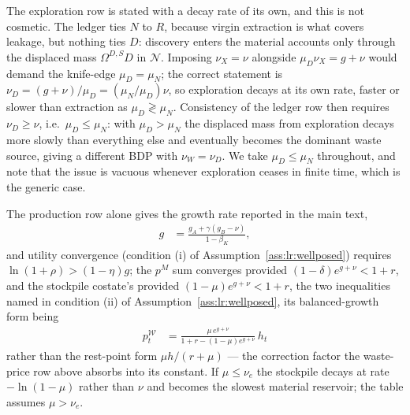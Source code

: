 The exploration row is stated with a decay rate of its own, and this is not cosmetic. The ledger ties $N$ to $R$, because virgin extraction is what covers leakage, but nothing ties $D$: discovery enters the material accounts only through the displaced mass $\Omega^{D,S}D$ in $\mathcal N$. Imposing $\nu_X=\nu$ alongside $\mu_D\nu_X=g+\nu$ would demand the knife-edge $\mu_D=\mu_N$; the correct statement is $\nu_D=\left(g+\nu\right)/\mu_D=\left(\mu_N/\mu_D\right)\nu$, so exploration decays at its own rate, faster or slower than extraction as $\mu_D\gtrless\mu_N$. Consistency of the ledger row then requires $\nu_D\ge\nu$, i.e.\ $\mu_D\le\mu_N$: with $\mu_D>\mu_N$ the displaced mass from exploration decays more slowly than everything else and eventually becomes the dominant waste source, giving a different BDP with $\nu_W=\nu_D$. We take $\mu_D\le\mu_N$ throughout, and note that the issue is vacuous whenever exploration ceases in finite time, which is the generic case.

The production row alone gives the growth rate reported in the main text,
\begin{align}
g &= \frac{g_A+\gamma\left(g_B-\nu\right)}{1-\beta_K},
\label{eq:app:wh:g}
\end{align}
and utility convergence (condition (i) of Assumption~\ref{ass:lr:wellposed}) requires $\ln\left(1+\rho\right)>\left(1-\eta\right)g$; the $p^M$ sum converges provided $\left(1-\delta\right)e^{g+\nu}<1+r$, and the stockpile costate's provided $\left(1-\mu\right)e^{g+\nu}<1+r$, the two inequalities named in condition (ii) of Assumption~\ref{ass:lr:wellposed}, its balanced-growth form being
\begin{align}
p^{\mathcal W}_t &= \frac{\mu\,e^{g+\nu}}{1+r-\left(1-\mu\right)e^{g+\nu}}\,h_t
\label{eq:app:wh:pWbg}
\end{align}
rather than the rest-point form $\mu h/\left(r+\mu\right)$ --- the correction factor the waste-price row above absorbs into its constant. If $\mu\le\nu_e$ the stockpile decays at rate $-\ln\left(1-\mu\right)$ rather than $\nu$ and becomes the slowest material reservoir; the table assumes $\mu>\nu_e$.

